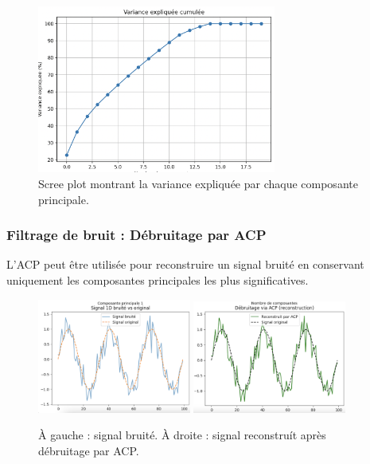 \documentclass[a4paper,12pt]{report}
\begin{document}
\begin{figure}[h!]
  \centering
  \includegraphics[width=0.7\textwidth]{scree_plot.png} %
  \caption{Scree plot montrant la variance expliqu\'ee par chaque composante principale.}
  \label{fig:scree_plot}
\end{figure}

\subsubsection{Filtrage de bruit : D\'ebruitage par ACP}
L'ACP peut \^etre utilis\'ee pour reconstruire un signal bruit\'e en conservant uniquement les composantes principales les plus significatives.

\begin{figure}[h!]
  \centering
  \includegraphics[width=0.45\textwidth]{signal_bruite.png} %
  \includegraphics[width=0.45\textwidth]{signal_debruite.png} %
  \caption{\`A gauche : signal bruit\'e. \`A droite : signal reconstru\'it apr\`es d\'ebruitage par ACP.}
  \label{fig:debruitage}
\end{figure}
\end{document}

